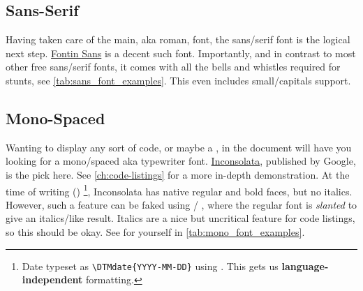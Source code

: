 \subsection{Sans-Serif}

Having taken care of the main, aka roman, font, the sans\-/serif font is the
logical next step.
\href{https://www.exljbris.com/fontinsans.html}{Fontin Sans} is a decent such font.
Importantly, and in contrast to most other free sans\-/serif fonts, it comes with all
the bells and whistles required for stunts, see \cref{tab:sans_font_examples}.
This even includes small\-/capitals support.

\begin{table}\ContinuedFloat
\end{table}

\subsection{Mono-Spaced}
\label{ch:mono-spaced}

Wanting to display any sort of code, or maybe a ,
in the document will have you looking for a mono\-/spaced aka typewriter font.
\href{https://fonts.google.com/specimen/Inconsolata}{Inconsolata}, published by Google,
is the pick here.
See \cref{ch:code-listings} for a more in-depth demonstration.
At the time of writing ()%
\footnote{%
    Date typeset as \texttt{\textbackslash{}DTMdate\{YYYY-MM-DD\}} using
    .
    This gets us \textbf{language-independent}
     formatting.
},
Inconsolata has native regular and bold faces, but no italics.
However, such a feature can be faked using /%
, where the regular font is \emph{slanted} to give an
italics\-/like result.
Italics are a nice but uncritical feature for code listings, so this should be okay.
See for yourself in \cref{tab:mono_font_examples}.

